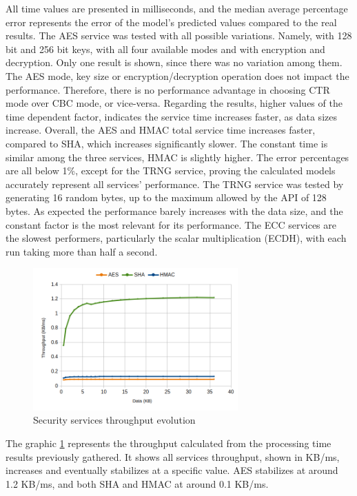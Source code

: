 All time values are presented in milliseconds, and the median average percentage error represents the error of the model's predicted values compared to the real results.
The AES service was tested with all possible variations. Namely, with 128 bit and 256 bit keys, with all four available modes and with encryption and decryption. Only one result is shown, since there was no variation among them. The AES mode, key size or encryption/decryption operation does not impact the performance. Therefore, there is no performance advantage in choosing CTR mode over CBC mode, or vice-versa.
Regarding the results, higher values of the time dependent factor, indicates the service time increases faster, as data sizes increase. Overall, the AES and HMAC total service time increases faster, compared to SHA, which increases significantly slower. The constant time is similar among the three services, HMAC is slightly higher.
The error percentages are all below 1\%, except for the TRNG service, proving the calculated models accurately represent all services' performance.
The TRNG service was tested by generating 16 random bytes, up to the maximum allowed by the API of 128 bytes. As expected the performance barely increases with the data size, and the constant factor is the most relevant for its performance.
The ECC services are the slowest performers, particularly the scalar multiplication (ECDH), with each run taking more than half a second.

\begin{figure}[h!]
	\centering
	\includegraphics[width=0.7\textwidth]{./Images/core-tput.png}
	\caption{Security services throughput evolution}
	\label{fig:performance:core-tput}
\end{figure}

The graphic \ref{fig:performance:core-tput} represents the throughput calculated from the processing time results previously gathered. It shows all services throughput, shown in KB/ms, increases and eventually stabilizes at a specific value. AES stabilizes at around 1.2 KB/ms, and both SHA and HMAC at around 0.1 KB/ms.

